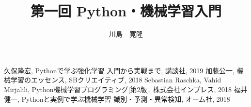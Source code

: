 \documentclass[a4j, dvipdfmx, 12pt]{jsbook}
\title{第一回 Python・機械学習入門}
\author{川島　寛隆}
\date{}
\begin{document}
	\maketitle
	\tableofcontents
	
	
	
	
	\begin{thebibliography}{9}
		 久保隆宏, Pythonで学ぶ強化学習 入門から実戦まで, 講談社, 2019
		 加藤公一, 機械学習のエッセンス, SBクリエイティブ, 2018
		 Sebastian Raschka, Vahid Mirjalili, Python機械学習プログラミング[第2版], 株式会社インプレス, 2018
		 福井健一, Pythonと実例で学ぶ機械学習 識別・予測・異常検知, オーム社, 2018
		
	\end{thebibliography}
	
\end{document}

